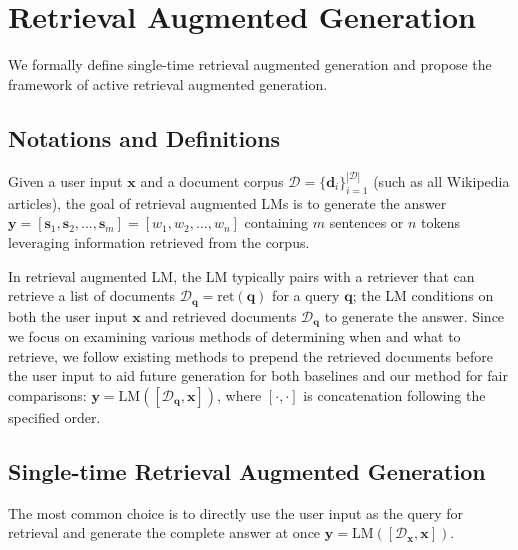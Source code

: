 \section{Retrieval Augmented Generation}
We formally define single-time retrieval augmented generation and propose the framework of active retrieval augmented generation.

\subsection{Notations and Definitions}
Given a user input $\bm{x}$ and a document corpus $\mathcal{D}=\{\bm{d}_i\}_{i=1}^{|\mathcal{D}|}$ (such as all Wikipedia articles), the goal of retrieval augmented LMs is to generate the answer $\bm{y}=[\bm{s}_1,\bm{s}_2,...,\bm{s}_m]=[w_1, w_2,...,w_n]$ containing $m$ sentences or $n$ tokens leveraging information retrieved from the corpus.

In retrieval augmented LM, the LM typically pairs with a retriever that can retrieve a list of documents $\mathcal{D}_{\bm{q}}=\text{ret}(\bm{q})$ for a query $\bm{q}$; the LM conditions on both the user input $\bm{x}$ and retrieved documents $\mathcal{D}_{\bm{q}}$ to generate the answer.
Since we focus on examining various methods of determining when and what to retrieve, we follow existing methods \cite{icrlm-ram-2023,ircot-trivedi-2022} to prepend the retrieved documents before the user input to aid future generation for both baselines and our method for fair comparisons: $\bm{y}=\text{LM}([\mathcal{D}_{\bm{q}},\bm{x}])$, where $[\cdot,\cdot]$ is concatenation following the specified order.

\subsection{Single-time Retrieval Augmented Generation}\label{sec:baseline_single}
The most common choice is to directly use the user input as the query for retrieval and generate the complete answer at once $\bm{y}=\text{LM}([\mathcal{D}_{\bm{x}},\bm{x}])$.

